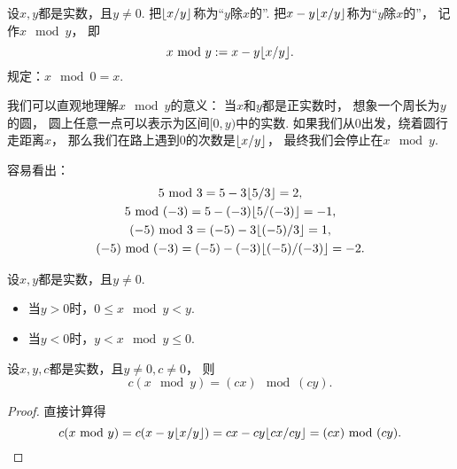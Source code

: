 \begin{definition}
设\(x,y\)都是实数，且\(y\neq0\).
把\(\lfloor x/y\rfloor\)称为“\(y\)除\(x\)的”.
把\(x - y \lfloor x/y\rfloor\)称为“\(y\)除\(x\)的”，
记作\(x \mod y\)，
即\[
	x ~\mathrm{mod}~ y
	:=
	x - y \lfloor x/y\rfloor.
\]
规定：\(x \mod 0 = x\).
\end{definition}

我们可以直观地理解\(x \mod y\)的意义：
当\(x\)和\(y\)都是正实数时，
想象一个周长为\(y\)的圆，
圆上任意一点可以表示为区间\([0,y)\)中的实数.
如果我们从\(0\)出发，绕着圆行走距离\(x\)，
那么我们在路上遇到\(0\)的次数是\(\lfloor x/y\rfloor\)，
最终我们会停止在\(x \mod y\).

\begin{example}
容易看出：\begin{gather*}
	5~\mathrm{mod}~3
	= 5-3\lfloor5/3\rfloor
	= 2, \\
	5~\mathrm{mod}~(-3)
	= 5-(-3)\lfloor5/(-3)\rfloor
	= -1, \\
	(-5)~\mathrm{mod}~3
	= (-5)-3\lfloor(-5)/3\rfloor
	= 1, \\
	(-5)~\mathrm{mod}~(-3)
	= (-5)-(-3)\lfloor(-5)/(-3)\rfloor
	= -2.
\end{gather*}
\end{example}

\begin{property}
设\(x,y\)都是实数，且\(y\neq0\).
\begin{itemize}
	\item 当\(y>0\)时，\(0 \leq x \mod y < y\).
	\item 当\(y<0\)时，\(y < x \mod y \leq 0\).
\end{itemize}
\end{property}

\begin{property}
设\(x,y,c\)都是实数，且\(y\neq0,c\neq0\)，
则\begin{equation}
	c (x \mod y)
	= (c x) \mod (c y).
\end{equation}
\begin{proof}
直接计算得\begin{equation*}
	c (x ~\mathrm{mod}~ y)
	= c (x - y \lfloor x / y\rfloor)
	= c x - cy \lfloor cx / cy\rfloor
	= (c x) ~\mathrm{mod}~ (c y).
\end{equation*}
\end{proof}
\end{property}

